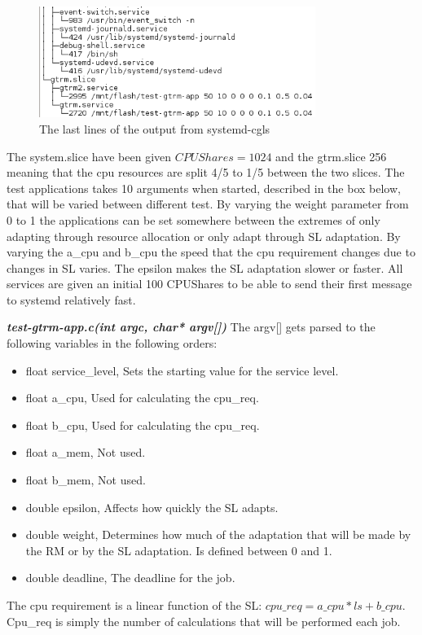 \documentclass[nobiblatex]{LTHthesis}
\begin{document}
\begin{figure}[h]
    \centering
    \includegraphics[width=0.8\textwidth]{systemd-cgls1}
    \caption{The last lines of the output from systemd-cgls}
    \label{fig:systemd-cgls2}
\end{figure}



The system.slice have been given $CPUShares = 1024$ and the gtrm.slice 256 meaning that the cpu resources are split 4/5 to 1/5 between the two slices. The test applications takes 10 arguments when started, described in the box below, that will be varied between different test. By varying the weight parameter from 0 to 1 the applications can be set somewhere between the extremes of only adapting through resource allocation or only adapt through SL adaptation.
By varying the a\_cpu and b\_cpu the speed that the cpu requirement changes due to changes in SL varies. The epsilon makes the SL adaptation slower or faster. All services are given an initial 100 CPUShares to be able to send their first message to systemd relatively fast.


\begin{framed}
	\begin{flushleft}
		\textbf{\emph{test-gtrm-app.c(int argc, char* argv[])}}
		The argv[] gets parsed to the following variables in the following orders:
		\begin{itemize}
		\item float service\_level, Sets the starting value for the service level.
		\item float a\_cpu, Used for calculating the cpu\_req.
		\item float b\_cpu, Used for calculating the cpu\_req.
		\item float a\_mem, Not used.
		\item float b\_mem, Not used.
		\item double epsilon, Affects how quickly the SL adapts.
		\item double weight, Determines how much of the adaptation that will be made by the RM or by the SL adaptation. Is defined between 0 and 1.
		\item double deadline, The deadline for the job.
		\end{itemize}
		The cpu requirement is a linear function of the SL: $cpu\_req = a\_cpu*ls +b\_cpu  $. Cpu\_req is simply the number of calculations 
		that will be performed each job. 
	\end{flushleft}
\end{framed}	
\end{document}
